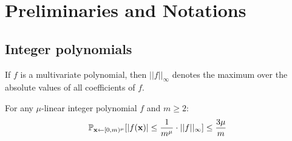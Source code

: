 \section{Preliminaries and Notations}

\subsection{Integer polynomials} If $f$ is a multivariate polynomial, then $||f||_\infty$ denotes the maximum over the absolute values of all coefficients of $f$. 

\begin{lemma}\label{lem:evalbound} For any $\mu$-linear integer polynomial $f$ and $m \geq 2$:
 $$\mathbb{P}_{\mathbf{x} \gets [0,m)^\mu} [|f(\mathbf{x})|\leq \frac{1}{m^\mu} \cdot ||f||_\infty]\leq \frac{3\mu}{m}$$
 \end{lemma} 

